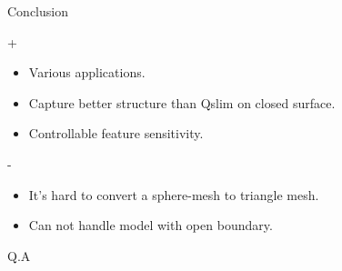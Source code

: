 \documentclass{beamer}
\begin{document}
\begin{frame}{Conclusion}
\begin{block}{+}
\begin{itemize}
\item Various applications.
\item Capture better structure than Qslim on closed surface.
\item Controllable feature sensitivity.
\end{itemize}
\end{block}
\begin{block}{-}
\begin{itemize}
\item It's hard to convert a sphere-mesh to triangle mesh.
\item Can not handle model with open boundary.
\end{itemize}
\end{block}
\end{frame}

\begin{frame}{Q.A}
\end{frame}
\end{document}
